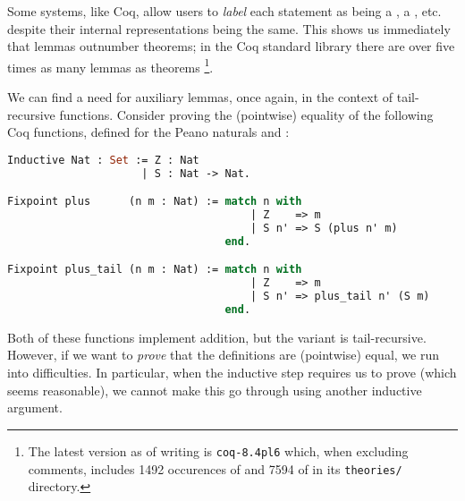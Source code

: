 Some systems, like Coq, allow users to \emph{label} each statement as being a , a , etc. despite their internal representations being the same. This shows us immediately that lemmas outnumber theorems; in the Coq standard library there are over five times as many lemmas as theorems \footnote{The latest version as of writing is \texttt{coq-8.4pl6} which, when excluding comments, includes 1492 occurences of  and 7594 of  in its \texttt{theories/} directory.}.



We can find a need for auxiliary lemmas, once again, in the context of tail-recursive functions. Consider proving the (pointwise) equality of the following Coq functions, defined for the Peano naturals  and :

\begin{lstlisting}[language=ML, xleftmargin=.2\textwidth, xrightmargin=.2\textwidth]
Inductive Nat : Set := Z : Nat
                     | S : Nat -> Nat.

Fixpoint plus      (n m : Nat) := match n with
                                      | Z    => m
                                      | S n' => S (plus n' m)
                                  end.

Fixpoint plus_tail (n m : Nat) := match n with
                                      | Z    => m
                                      | S n' => plus_tail n' (S m)
                                  end.
\end{lstlisting}

\iffalse

Haskell equivalent:

plus :: Nat -> Nat -> Nat
plus      n  Z    = n
plus      n (S m) = S (plus n m)

plus_tail :: Nat -> Nat -> Nat
plus_tail n  Z    = n
plus_tail n (S m) = plus_tail (S n) m

\fi

Both of these functions implement addition, but the  variant is tail-recursive. However, if we want to \emph{prove} that the definitions are (pointwise) equal, we run into difficulties. In particular, when the inductive step requires us to prove  (which seems reasonable), we cannot make this go through using another inductive argument.

